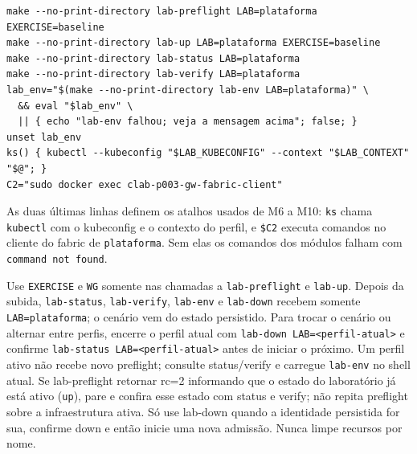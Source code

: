 \documentclass[12pt,openany,oneside,a4paper,chapter=TITLE,english,brazil]{abntex2}
\begin{document}
\begin{verbatim}
make --no-print-directory lab-preflight LAB=plataforma EXERCISE=baseline
make --no-print-directory lab-up LAB=plataforma EXERCISE=baseline
make --no-print-directory lab-status LAB=plataforma
make --no-print-directory lab-verify LAB=plataforma
lab_env="$(make --no-print-directory lab-env LAB=plataforma)" \
  && eval "$lab_env" \
  || { echo "lab-env falhou; veja a mensagem acima"; false; }
unset lab_env
ks() { kubectl --kubeconfig "$LAB_KUBECONFIG" --context "$LAB_CONTEXT" "$@"; }
C2="sudo docker exec clab-p003-gw-fabric-client"
\end{verbatim}

As duas últimas linhas definem os atalhos usados de M6 a M10: \texttt{ks} chama
\texttt{kubectl} com o kubeconfig e o contexto do perfil, e \texttt{\$C2} executa comandos no
cliente do fabric de \texttt{plataforma}. Sem elas os comandos dos módulos falham com
\texttt{command not found}.

Use \texttt{EXERCISE} e \texttt{WG} somente nas chamadas a \texttt{lab-{}\allowbreak{}preflight} e \texttt{lab-{}\allowbreak{}up}.
Depois da subida, \texttt{lab-{}\allowbreak{}status}, \texttt{lab-{}\allowbreak{}verify}, \texttt{lab-{}\allowbreak{}env} e \texttt{lab-{}\allowbreak{}down} recebem
somente \texttt{LAB=\allowbreak{}plataforma}; o cenário vem do estado persistido. Para trocar o
cenário ou alternar entre perfis, encerre o perfil atual com
\texttt{lab-{}\allowbreak{}down LAB=\allowbreak{}\textless{}perfil-{}\allowbreak{}atual\textgreater{}} e confirme \texttt{lab-{}\allowbreak{}status LAB=\allowbreak{}\textless{}perfil-{}\allowbreak{}atual\textgreater{}} antes
de iniciar o próximo. Um perfil ativo não recebe novo preflight; consulte
status/verify e carregue \texttt{lab-{}\allowbreak{}env} no shell atual. Se lab-preflight retornar
rc=2 informando que o estado do laboratório já está ativo (\texttt{up}), pare e confira esse estado com status e
verify; não repita preflight sobre a infraestrutura ativa. Só use lab-down
quando a identidade persistida for sua, confirme down e então inicie uma nova
admissão. Nunca limpe recursos por nome.
\end{document}
